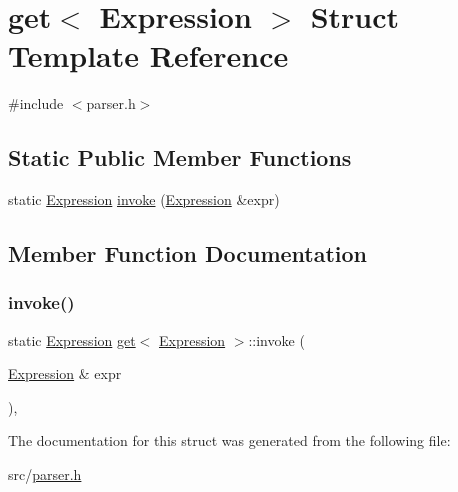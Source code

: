\hypertarget{structget_3_01_expression_01_4}{}\section{get$<$ Expression $>$ Struct Template Reference}
\label{structget_3_01_expression_01_4}


{\ttfamily \#include $<$parser.\+h$>$}

\subsection*{Static Public Member Functions}
\begin{DoxyCompactItemize}
\item 
static \hyperlink{ast_8h_a4cb273a4d960cd13ea17d08f254493e8}{Expression} \hyperlink{structget_3_01_expression_01_4_ae9cc35964d2d248953fea796ad0021c1}{invoke} (\hyperlink{ast_8h_a4cb273a4d960cd13ea17d08f254493e8}{Expression} \&expr)
\end{DoxyCompactItemize}


\subsection{Member Function Documentation}
\mbox{\label{structget_3_01_expression_01_4_ae9cc35964d2d248953fea796ad0021c1}} 
\subsubsection{\texorpdfstring{invoke()}{invoke()}}
{\footnotesize\ttfamily static \hyperlink{ast_8h_a4cb273a4d960cd13ea17d08f254493e8}{Expression} \hyperlink{structget}{get}$<$ \hyperlink{ast_8h_a4cb273a4d960cd13ea17d08f254493e8}{Expression} $>$\+::invoke (\begin{DoxyParamCaption}\item[{\hyperlink{ast_8h_a4cb273a4d960cd13ea17d08f254493e8}{Expression} \&}]{expr }\end{DoxyParamCaption})\hspace{0.3cm}{\ttfamily [inline]}, {\ttfamily [static]}}



The documentation for this struct was generated from the following file\+:\begin{DoxyCompactItemize}
\item 
src/\hyperlink{parser_8h}{parser.\+h}\end{DoxyCompactItemize}
